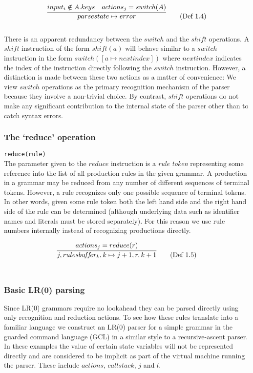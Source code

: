 \documentclass[envcountsame,runningheads]{llncs}
\begin{document}
\begin{equation}
\infer{parsestate \mapsto error}{input_i \notin A.keys & actions_j = switch(A)} \tag{Def 1.4}
\end{equation}\\

There is an apparent redundancy between the $switch$ and the $shift$ operations. 
A $shi\!ft$ instruction of the form $sh\!ift(a)$ will behave similar to a $switch$ instruction in the form $switch([a \mapsto nextindex])$ where $nextindex$ indicates the index of the instruction directly following the $switch$ instruction.
However, a distinction is made between these two actions as a matter of convenience: 
We view $switch$ operations as the primary recognition mechanism of the parser because they involve a non-trivial choice.
By contrast, $shi\!ft$ operations do not make any significant contribution to the internal state of the parser other than to catch syntax errors.
	
\subsubsection{The `reduce' operation}
\texttt{reduce(rule)}\\
The parameter given to the $reduce$ instruction is a \emph{rule token} representing some reference into the list of all production rules in the given grammar.
A production in a grammar may be reduced from any number of different sequences of terminal tokens. However, a rule recognizes only one possible sequence of terminal tokens.
In other words, given some rule token both the left hand side and the right hand side of the rule can be determined (although underlying data such as identifier names and literals must be stored separately).
For this reason we use rule numbers internally instead of recognizing productions directly.

\begin{equation}
\infer{j, rulesbu\!f\!f\!er_k, k \mapsto j+1, r, k+1}{actions_j = reduce(r)} \tag{Def 1.5}
\end{equation}\\

\subsubsection{Basic LR(0) parsing}

Since LR(0) grammars require no lookahead they can be parsed directly using only recognition and reduction actions.
To see how these rules translate into a familiar language we construct an LR(0) parser for a simple grammar in the guarded command language (GCL) in a similar style to a recursive-ascent parser.
In these examples the value of certain state variables will not be represented directly and are considered to be implicit as part of the virtual machine running the parser.
These include $actions$, $callstack$, $j$ and $l$.
\end{document}
